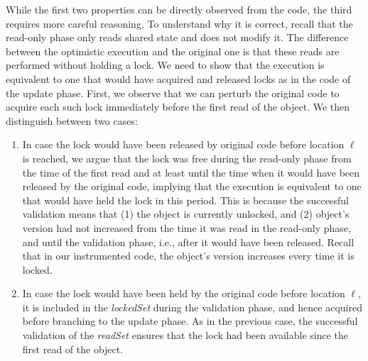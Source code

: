 While the first two properties can be directly observed from the code, the third requires more careful reasoning.
To understand why it is correct, recall that the read-only phase only reads shared state and does not modify it. 
The difference between the optimistic execution and the original one is that these reads are performed without 
holding a lock. We need to show that the execution is equivalent to one that would have acquired and released
locks as in the code of the update phase. First, we observe that we can perturb the original code to acquire each
such lock immediately before the first read of the object. We then distinguish between two cases:
\begin{enumerate}
\item In case the lock would have been released by original code before location $\ell$ is reached, 
we argue that the lock was free during the read-only phase from the time of the first read and at least until the time 
when it would have been released by the original code, implying that the execution is equivalent to one that would 
have held the lock in this period. This is because the successful validation means that (1) the object is currently
unlocked, and (2) object's version had not increased from the time it was read in the read-only phase, and until the 
validation phase, i.e., after it would have 
been released. Recall that in our instrumented code, the object's version increases every time it is locked.
\item In case the lock would have been held by the original code before location $\ell$, it is included in
the \emph{lockedSet} during the validation phase, and hence acquired before branching to the update phase.
As in the previous case, the successful validation of the \emph{readSet} ensures that the lock had been
available since the first read of the object.
\end{enumerate}

